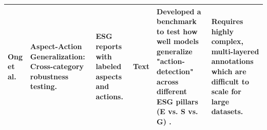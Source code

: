 \begin{landscape}
\begin{table}[p]
\begin{tabularx}{\linewidth}{|p{1.8cm}|X|X|p{1.8cm}|X|X|}
\textbf{Ong et al.}  \parencite{keane_ong_369a0b63} & \textbf{Aspect-Action Generalization}: Cross-category robustness testing. & ESG reports with labeled aspects and actions. & Text & Developed a benchmark to test how well models generalize "action-detection" across different ESG pillars (E vs. S vs. G)  \parencite{keane_ong_369a0b63}. & Requires highly complex, multi-layered annotations which are difficult to scale for large datasets. \\ \hline
\end{tabularx}
\end{table}
\end{landscape}
